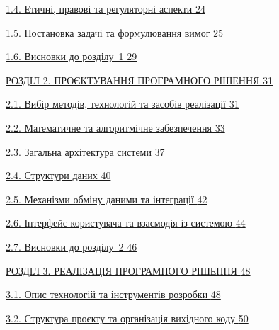 \documentclass[
]{article}
\begin{document}
\hyperref[ux435ux442ux438ux447ux43dux456-ux43fux440ux430ux432ux43eux432ux456-ux442ux430-ux440ux435ux433ux443ux43bux44fux442ux43eux440ux43dux456-ux430ux441ux43fux435ux43aux442ux438]{1.4.
Етичні, правові та регуляторні аспекти
\hyperref[ux435ux442ux438ux447ux43dux456-ux43fux440ux430ux432ux43eux432ux456-ux442ux430-ux440ux435ux433ux443ux43bux44fux442ux43eux440ux43dux456-ux430ux441ux43fux435ux43aux442ux438]{24}}

\hyperref[ux43fux43eux441ux442ux430ux43dux43eux432ux43aux430-ux437ux430ux434ux430ux447ux456-ux442ux430-ux444ux43eux440ux43cux443ux43bux44eux432ux430ux43dux43dux44f-ux432ux438ux43cux43eux433]{1.5.
Постановка задачі та формулювання вимог
\hyperref[ux43fux43eux441ux442ux430ux43dux43eux432ux43aux430-ux437ux430ux434ux430ux447ux456-ux442ux430-ux444ux43eux440ux43cux443ux43bux44eux432ux430ux43dux43dux44f-ux432ux438ux43cux43eux433]{25}}

\hyperref[ux432ux438ux441ux43dux43eux432ux43aux438-ux434ux43e-ux440ux43eux437ux434ux456ux43bux443-1]{1.6.
Висновки до розділу~1
\hyperref[ux432ux438ux441ux43dux43eux432ux43aux438-ux434ux43e-ux440ux43eux437ux434ux456ux43bux443-1]{29}}

\hyperref[_Toc228121443]{РОЗДІЛ 2. ПРОЄКТУВАННЯ ПРОГРАМНОГО РІШЕННЯ
\hyperref[_Toc228121443]{31}}

\hyperref[_Toc228121444]{2.1. Вибір методів, технологій та засобів
реалізації \hyperref[_Toc228121444]{31}}

\hyperref[_Toc228121450]{2.2. Математичне та алгоритмічне забезпечення
\hyperref[_Toc228121450]{33}}

\hyperref[_Toc228121457]{2.3. Загальна архітектура системи
\hyperref[_Toc228121457]{37}}

\hyperref[_Toc228121462]{2.4. Структури даних
\hyperref[_Toc228121462]{40}}

\hyperref[_Toc228121469]{2.5. Механізми обміну даними та інтеграції
\hyperref[_Toc228121469]{42}}

\hyperref[_Toc228121473]{2.6. Інтерфейс користувача та взаємодія із
системою \hyperref[_Toc228121473]{44}}

\hyperref[_Toc228121478]{2.7. Висновки до розділу~2
\hyperref[_Toc228121478]{46}}

\hyperref[_Toc229681122]{РОЗДІЛ 3. РЕАЛІЗАЦІЯ ПРОГРАМНОГО РІШЕННЯ
\hyperref[_Toc229681122]{48}}

\hyperref[_Toc229681123]{3.1. Опис технологій та інструментів розробки
\hyperref[_Toc229681123]{48}}

\hyperref[_Toc229681128]{3.2. Структура проєкту та організація вихідного
коду \hyperref[_Toc229681128]{50}}
\end{document}
